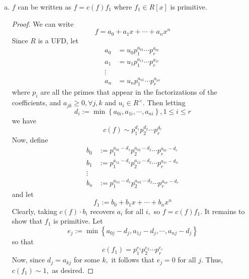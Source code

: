 \documentclass{article}
\begin{document}
\begin{itemize}
		\begin{enumerate}[(a)]
			\item $f$ can be written as $f=c(f)f_1$ where $f_1\in R[x]$ is primitive.
				\begin{proof}
					We can write
					\[f=a_0+a_1x+\cdots+a_nx^n\]
					Since $R$ is a UFD, let
					\begin{align*}
						a_0&=u_0p_1^{a_{01}}\cdots p_r^{a_{0r}} \\
						a_1&=u_1p_1^{a_{11}}\cdots p_r^{a_{1r}} \\
						\vdots& \\
						a_n&=u_np_1^{a_{n1}}\cdots p_r^{a_{nr}}
					\end{align*}
					where $p_i$ are all the primes that appear in the factorizations of the coefficients, and $a_{jk}\ge 0, \forall j, k$ and $u_i\in R^\times.$ Then letting 
					\[d_i:=\min\left\{ a_{0i}, a_{1i}, \cdots, a_{ni} \right\}, 1\le i\le r\]
					we have
					\[c(f) \sim p_1^{d_1}p_2^{d_2}\cdots p_r^{d_r}\]
					Now, define
					\begin{align*}
						b_0 &:= p_1^{a_{01}-d_1} p_2^{a_{02}-d_2}\cdots p_r^{a_{0r}-d_r} \\
						b_1 &:= p_1^{a_{11}-d_1}p_2^{a_{12}-d_2}\cdots p_r^{a_{1r}-d_n} \\
						\vdots & \\
						b_n &:= p_1^{a_{n1}-d_1} p_2^{a_{n2}-d_2}\cdots p_r^{a_{nr}-d_r}
					\end{align*}
					and let
					\[f_1:=b_0+b_1x+\cdots +b_n x^n\]
					Clearly, taking $c(f)\cdot b_i$ recovers $a_i$ for all $i,$ so $f = c(f)f_1.$ It remains to show that $f_1$ is primitive. Let
					\[e_j := \min\left\{ a_{0j}-d_j, a_{1j}-d_j, \cdots, a_{nj}-d_j \right\}\]
					so that
					\[c(f_1) = p_1^{e_1}p_2^{e_2}\cdots p_r^{e_r}\]
					Now, since $d_j=a_{kj}$ for some $k,$ it follows that $e_j=0$ for all $j.$ Thus, $c(f_1)\sim 1,$ as desired.
				\end{proof}


\end{enumerate}
\end{itemize}
\end{document}
